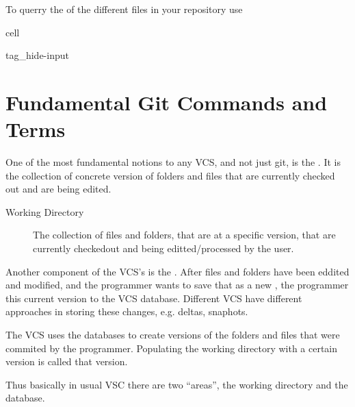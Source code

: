 \documentclass[a4paper,10pt,english]{jupyterBook}
\begin{document}
\sphinxAtStartPar
To querry the  of the different files in your repository use 

\sphinxstepscope

\begin{sphinxuseclass}{cell}
\begin{sphinxuseclass}{tag_hide-input}
\end{sphinxuseclass}
\end{sphinxuseclass}

\section{Fundamental Git Commands and Terms}
\label{\detokenize{text/progtut/gitbasic:fundamental-git-commands-and-terms}}\label{\detokenize{text/progtut/gitbasic::doc}}
\sphinxAtStartPar
One of the most fundamental notions to any VCS, and not just git, is the . It is the collection of concrete version of folders and files that are currently checked out and are being edited.
\begin{description}
\item[{Working Directory}] \leavevmode
\sphinxAtStartPar
The collection of files and folders, that are at a specific version, that are currently checked\sphinxhyphen{}out and being editted/processed by the user.

\end{description}

\sphinxAtStartPar
Another component of the VCS’s is the . After files and folders have been eddited and modified, and the programmer wants to save that as a new , the programmer  this current version to the VCS database. Different VCS have different approaches in storing these changes, e.g. deltas, snaphots.

\sphinxAtStartPar
The VCS uses the databases to create versions of the folders and files that were commited by the programmer. Populating the working directory with a certain version is called  that version.

\sphinxAtStartPar
Thus basically in usual VSC there are two “areas”, the working directory and the database.
\end{document}
